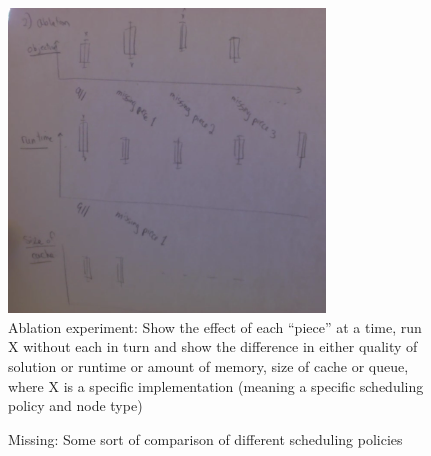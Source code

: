 \begin{arxiv}
\begin{figure}[t!]
\begin{center}
\includegraphics[width=0.75\textwidth]{figs/sketch-ablation.png}
\end{center}
\caption{Ablation experiment:
Show the effect of each ``piece'' at a time,
run X without each in turn and show the difference in either
quality of solution or runtime or amount of memory, size of cache or queue,
where X is a specific implementation
(meaning a specific scheduling policy and node type)}
\label{fig:ablation}
\end{figure}
\end{arxiv}

\begin{arxiv}
\begin{figure}[t!]
\begin{center}
\end{center}
\caption{Missing:  Some sort of comparison of different scheduling policies}
\label{fig:scheduling-policy}
\end{figure}
\end{arxiv}

